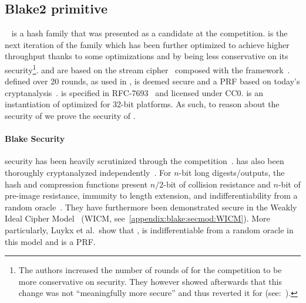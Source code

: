 \subsection{Blake2 primitive}\label{instantiation:prf-comm-crh:blake}

\blake{}{}~\cite{aumasson2008sha} is a hash family that was presented as a candidate at the  competition.  is the next iteration of the family which has been further optimized to achieve higher throughput thanks to some optimizations and by being less conservative on its security\footnote{The authors increased the number of rounds of \blake{}{} for the  competition to be more conservative on security. They however showed afterwards that this change was not ``meaningfully more secure'' and thus reverted it for  (see:~\cite[Section 2.1]{aumasson2013blake2}).}. \blake{}{} and  are based on the \chacha{} stream cipher~\cite{bernstein2008chacha} composed with the \haifa{} framework~\cite{biham2007framework}. \chacha{} defined over 20 rounds, as used in , is deemed secure and a PRF based on today's cryptanalysis~\cite{procter2014security,choudhuri2016differential}.  is specified in RFC-7693~\cite{blakecompietf} and licensed under CC0.  is an instantiation of  optimized for 32-bit platforms. As such, to reason about the security of  we prove the security of .

\paragraph*{Blake Security}

\blake{}{} security has been heavily scrutinized through the  competition~\cite{vidali2010collisions, ming2010security, andreeva2010security, alshaikhli2012comparison, andreeva2012security, andreeva2012provable, homsirikamol2012security}.  has also been thoroughly cryptanalyzed independently~\cite{guo2014analysis, hao2014boomerang, espitau2015higher, neves2019observation}. For $n$-bit long digests/outputs, the hash and compression functions present $n/2$-bit of collision resistance and $n$-bit of pre-image resistance, immunity to length extension, and indifferentiability from a random oracle~\cite{aumasson2013blake2}. They have furthermore been demonstrated secure in the Weakly Ideal Cipher Model~\cite{luykx2016security} (WICM, see~\cref{appendix:blake:secmod:WICM}). More particularly, Luykx et al.~show that , is indifferentiable from a random oracle in this model and is a PRF.

